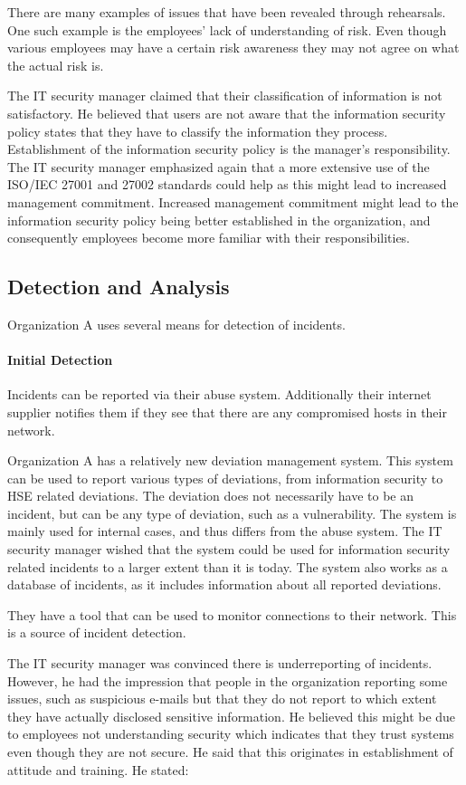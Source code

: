 There are many examples of issues that have been revealed through rehearsals. One such example is the employees' lack of understanding of risk. Even though various employees may have a certain risk awareness they may not agree on what the actual risk is. 

The IT security manager claimed that their classification of information is not satisfactory. He believed that users are not aware that the information security policy states that they have to classify the information they process. Establishment of the information security policy is the manager's responsibility. The IT security manager emphasized again that a more extensive use of the \acs{ISO}/\acs{IEC} 27001 and 27002 standards could help as this might lead to increased management commitment. Increased management commitment  might lead to the information security policy being better established in the organization, and consequently employees become more familiar with their responsibilities.

\subsection{Detection and Analysis}
Organization A uses several means for detection of incidents.

\paragraph{Initial Detection}
Incidents can be reported via their abuse system. Additionally their internet supplier notifies them if they see that there are any compromised hosts in their network. 

Organization A has a relatively new deviation management system. This system can be used to report various types of deviations, from information security to \ac{HSE} related deviations. The deviation does not necessarily have to be an incident, but can be any type of deviation, such as a vulnerability. The system is mainly used for internal cases, and thus differs from the abuse system. The IT security manager wished that the system could be used for information security related incidents to a larger extent than it is today. The system also works as a database of incidents, as it includes information about all reported deviations.  

They have a tool that can be used to monitor connections to their network. This is a source of incident detection.

The IT security manager was convinced there is underreporting of incidents. However, he had the impression that people in the organization reporting some issues, such as suspicious e-mails but that they do not report to which extent they have actually disclosed sensitive information. He believed this might be due to employees not understanding security which indicates that they trust systems even though they are not secure. He said that this originates in establishment of attitude and training. He stated:

